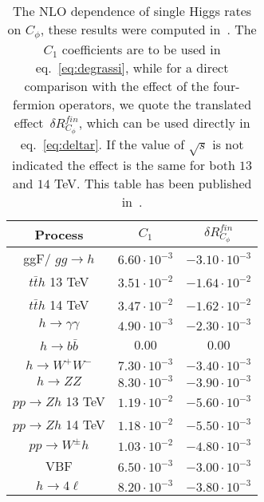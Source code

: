 
\begin{table}[h]
\centering
\begin{tabular}{ccc}
\toprule
Process&$C_1$ & $\delta R_{C_\phi}^{fin}$ \\
\midrule
ggF/ $gg\to h$  & $6.60\cdot 10^{-3}$ &  $-3.10\cdot 10^{-3}$ \\
$t\bar{t}h$   \textcolor{Mahogany}{13 TeV} & $3.51\cdot 10^{-2}$  &  $-1.64\cdot 10^{-2}$  \\
$t\bar{t}h$   \textcolor{Mahogany}{14 TeV} & $3.47\cdot 10^{-2}$  &  $-1.62\cdot 10^{-2}$ \\
$h\to \gamma \gamma$   & $4.90\cdot 10^{-3}$ &  $-2.30\cdot 10^{-3}$ \\
$h\to b\bar{b}$ & 0.00&0.00  \\
$h\to W^+ W^-$  & $7.30\cdot 10^{-3}$  & $-3.40\cdot 10^{-3}$ \\
$h\to Z Z$      & $8.30\cdot 10^{-3}$&  $-3.90\cdot 10^{-3}$ \\
$pp\to Zh$   \textcolor{Mahogany}{13 TeV}    & $1.19\cdot 10^{-2}$& $-5.60\cdot 10^{-3}$ \\
$pp\to Zh$    \textcolor{Mahogany}{14 TeV}    &$1.18\cdot 10^{-2}$&  $-5.50\cdot 10^{-3}$ \\
$pp\to W^\pm h$  & $1.03\cdot 10^{-2}$ &    $-4.80\cdot 10^{-3}$\\
VBF              & $6.50\cdot 10^{-3}$&   $-3.00\cdot 10^{-3}$ \\
$ h \to 4 \ell$       &     $8.20\cdot 10^{-3}$  &   $-3.80\cdot 10^{-3}$ \\
\bottomrule
\end{tabular}
\caption{The NLO dependence of single Higgs rates on $C_\phi$, these results were computed in~\cite{ Degrassi:2021uik}. The $C_1$ coefficients are to be used in eq.~\eqref{eq:degrassi}, while for a direct  comparison with the effect of the four-fermion operators, we quote the translated effect~$\delta R_{C_\phi}^{fin}$, which can be used directly in eq.~\eqref{eq:deltar}. If the value of $\sqrt{s}$ is not indicated the effect is the same for both $13$ and $14$ TeV. This table has been published in~\cite{Alasfar:2022zyr}.
}
\label{table:resch}
\end{table}
